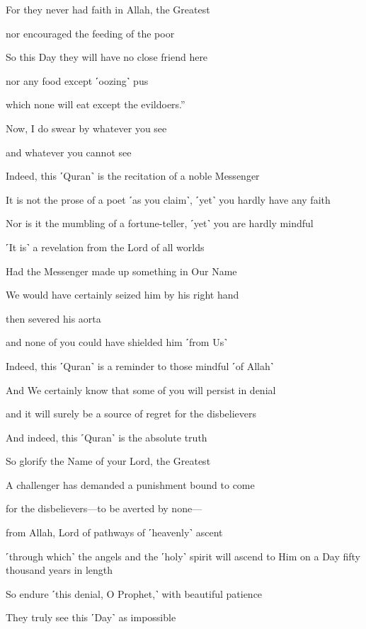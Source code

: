 For they never had faith in Allah, the Greatest

nor encouraged the feeding of the poor

So this Day they will have no close friend here

nor any food except ˹oozing˺ pus

which none will eat except the evildoers.”

Now, I do swear by whatever you see

and whatever you cannot see

Indeed, this ˹Quran˺ is the recitation of a noble Messenger

It is not the prose of a poet ˹as you claim˺, ˹yet˺ you hardly have any faith

Nor is it the mumbling of a fortune-teller, ˹yet˺ you are hardly mindful

˹It is˺ a revelation from the Lord of all worlds

Had the Messenger made up something in Our Name

We would have certainly seized him by his right hand

then severed his aorta

and none of you could have shielded him ˹from Us˺

Indeed, this ˹Quran˺ is a reminder to those mindful ˹of Allah˺

And We certainly know that some of you will persist in denial

and it will surely be a source of regret for the disbelievers

And indeed, this ˹Quran˺ is the absolute truth

So glorify the Name of your Lord, the Greatest

A challenger has demanded a punishment bound to come

for the disbelievers—to be averted by none—

from Allah, Lord of pathways of ˹heavenly˺ ascent

˹through which˺ the angels and the ˹holy˺ spirit will ascend to Him on a Day fifty thousand years in length

So endure ˹this denial, O Prophet,˺ with beautiful patience

They truly see this ˹Day˺ as impossible

